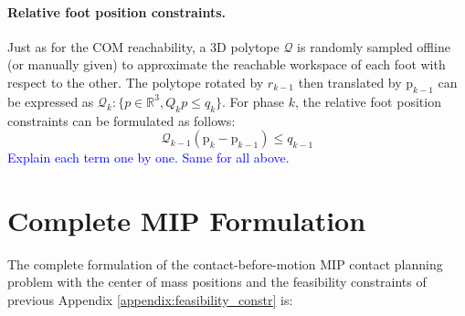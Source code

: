 \paragraph{Relative foot position constraints.\label{appendix:foot_pos_constr}}
Just as for the COM reachability, a 3D polytope $\mathcal{Q}$ is randomly sampled offline (or manually given) to approximate the reachable workspace of each foot with respect to the other. The polytope rotated by $r_{k-1}$ then translated by $\mbox{p}_{k-1}$ can be expressed as $\mathcal{Q}_k: \{ p \in \mathbb{R}^3, Q_k p \leq q_k \}$.
For phase $k$, the relative foot position constraints can be formulated as follows:
\begin{equation}
    \mathcal{Q}_{k-1} (\mbox{p}_k - \mbox{p}_{k-1}) \leq q_{k-1}
\end{equation}
\textcolor{blue}{Explain each term one by one. Same for all above.}

\section{Complete MIP Formulation \label{appendix:complete_mip_formulation}}
The complete formulation of the contact-before-motion MIP contact planning problem with the center of mass positions and the feasibility constraints of previous Appendix \ref{appendix:feasibility_constr} is:

